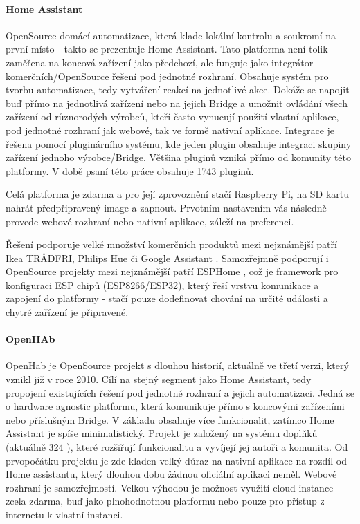 \paragraph{Home Assistant}
OpenSource domácí automatizace, která klade lokální kontrolu a soukromí na první místo - takto se prezentuje Home Assistant. Tato platforma není tolik zaměřena na koncová zařízení jako předchozí, ale funguje jako integrátor komerčních/OpenSource řešení pod jednotné rozhraní. Obsahuje systém pro tvorbu automatizace, tedy vytváření reakcí na jednotlivé akce. Dokáže se napojit buď přímo na jednotlivá zařízení nebo na jejich Bridge a umožnit ovládání všech zařízení od různorodých výrobců, kteří často vynucují použití vlastní aplikace, pod jednotné rozhraní jak webové, tak ve formě nativní aplikace. Integrace je řešena pomocí pluginárního systému, kde jeden plugin obsahuje integraci skupiny zařízení jednoho výrobce/Bridge. Většina pluginů vzniká přímo od komunity této platformy. V době psaní této práce obsahuje 1743 pluginů. \cite{ha}

Celá platforma je zdarma a pro její zprovoznění stačí Raspberry Pi, na SD kartu nahrát předpřipravený image a zapnout. Prvotním nastavením vás následně provede webové rozhraní nebo nativní aplikace, záleží na preferenci. \cite{ha-doc}

Řešení podporuje velké množství komerčních produktů mezi nejznámější patří Ikea TRÅDFRI, Philips Hue či Google Assistant \cite{ha-integrations}. Samozřejmně podporují i OpenSource projekty mezi nejznámější patří ESPHome \cite{esphome}, což je framework pro konfiguraci ESP chipů (ESP8266/ESP32), který řeší vrstvu komunikace a zapojení do platformy - stačí pouze dodefinovat chování na určité události a chytré zařízení je připravené.

\paragraph{OpenHAb}
OpenHab je OpenSource projekt s dlouhou historií, aktuálně ve třetí verzi, který vznikl již v roce 2010. Cílí na stejný segment jako Home Assistant, tedy  propojení existujících řešení pod jednotné rozhraní a jejich automatizaci. Jedná se o hardware agnostic platformu, která komunikuje přímo s koncovými zařízeními nebo příslušným Bridge. V základu obsahuje více funkcionalit, zatímco Home Assistant je spíše minimalistický. Projekt je založený na systému doplňků (aktuálně 324 \cite{openhab-addons}), které rozšiřují funkcionalitu a vyvíjejí jej autoři a komunita. Od prvopočátku projektu je zde kladen velký důraz na nativní aplikace na rozdíl od Home assistantu, který dlouhou dobu žádnou oficiální aplikaci neměl. Webové rozhraní je samozřejmostí. Velkou výhodou je možnost využití cloud instance zcela zdarma, buď jako plnohodnotnou platformu nebo pouze pro přístup z internetu k vlastní instanci. \cite{openhab}

